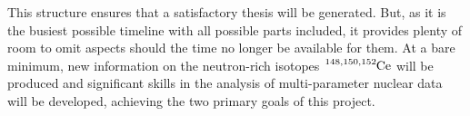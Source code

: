\documentclass[12pt,a4paper]{article}
\begin{document}
This structure ensures that a satisfactory thesis will be generated.
But, as it is the busiest possible timeline with all possible parts included, it provides plenty of room to omit aspects should the time no longer be available for them.
At a bare minimum, new information on the neutron-rich isotopes $\ce{^{148,150,152}Ce}$ will be produced and significant skills in the analysis of multi-parameter nuclear data will be developed, achieving the two primary goals of this project.



{}
\end{document}
